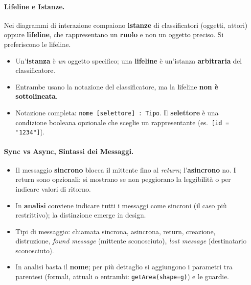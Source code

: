 \documentclass[12pt]{extarticle}
\begin{document}
\paragraph{Lifeline e Istanze.}
Nei diagrammi di interazione compaiono \textbf{istanze} di classificatori (oggetti, attori) oppure \textbf{lifeline}, che rappresentano un \textbf{ruolo} e non un oggetto preciso. Si preferiscono le lifeline.
\begin{itemize}
    \item Un'\textbf{istanza} è \textit{un} oggetto specifico; una \textbf{lifeline} è un'istanza \textbf{arbitraria} del classificatore.
    \item Entrambe usano la notazione del classificatore, ma la lifeline \textbf{non è sottolineata}.
    \item Notazione completa: \texttt{nome [selettore] : Tipo}. Il \textbf{selettore} è una condizione booleana opzionale che sceglie un rappresentante (es.\ \texttt{[id = "1234"]}).
\end{itemize}

\paragraph{Sync vs Async, Sintassi dei Messaggi.}
\begin{itemize}
    \item Il messaggio \textbf{sincrono} blocca il mittente fino al \textit{return}; l'\textbf{asincrono} no. I return sono opzionali: si mostrano se non peggiorano la leggibilità o per indicare valori di ritorno.
    \item In \textbf{analisi} conviene indicare tutti i messaggi come sincroni (il caso più restrittivo); la distinzione emerge in design.
    \item Tipi di messaggio: chiamata sincrona, asincrona, return, creazione, distruzione, \textit{found message} (mittente sconosciuto), \textit{lost message} (destinatario sconosciuto).
    \item In analisi basta il \textbf{nome}; per più dettaglio si aggiungono i parametri tra parentesi (formali, attuali o entrambi: \texttt{getArea(shape=g)}) e le guardie.
\end{itemize}
\end{document}
